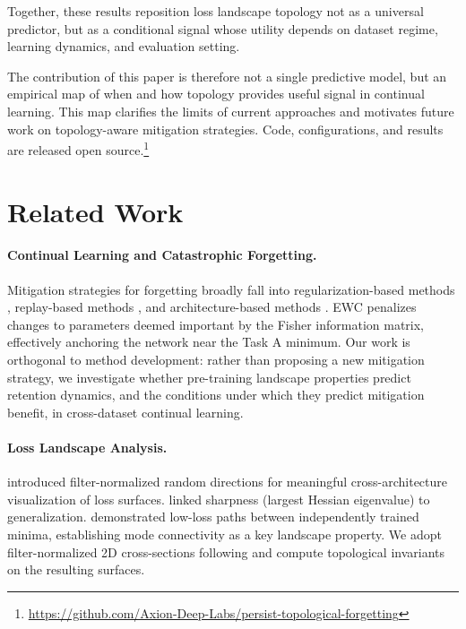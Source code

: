 \documentclass[10pt,twocolumn]{article}
\begin{document}
Together, these results reposition loss landscape topology not as a universal predictor, but as a conditional signal whose utility depends on dataset regime, learning dynamics, and evaluation setting.

The contribution of this paper is therefore not a single predictive model, but an empirical map of when and how topology provides useful signal in continual learning. This map clarifies the limits of current approaches and motivates future work on topology-aware mitigation strategies. Code, configurations, and results are released open source.\footnote{\url{https://github.com/Axion-Deep-Labs/persist-topological-forgetting}}

\section{Related Work}
\label{sec:related}

\paragraph{Continual Learning and Catastrophic Forgetting.}
Mitigation strategies for forgetting broadly fall into regularization-based methods \citep{kirkpatrick2017overcoming, zenke2017continual}, replay-based methods \citep{rebuffi2017icarl, shin2017continual}, and architecture-based methods \citep{rusu2016progressive, mallya2018packnet}. EWC \citep{kirkpatrick2017overcoming} penalizes changes to parameters deemed important by the Fisher information matrix, effectively anchoring the network near the Task A minimum. Our work is orthogonal to method development: rather than proposing a new mitigation strategy, we investigate whether pre-training landscape properties predict retention dynamics, and the conditions under which they predict mitigation benefit, in cross-dataset continual learning.

\paragraph{Loss Landscape Analysis.}
\citet{li2018visualizing} introduced filter-normalized random directions for meaningful cross-architecture visualization of loss surfaces. \citet{keskar2017on} linked sharpness (largest Hessian eigenvalue) to generalization. \citet{garipov2018loss} demonstrated low-loss paths between independently trained minima, establishing mode connectivity as a key landscape property. We adopt filter-normalized 2D cross-sections following \citet{li2018visualizing} and compute topological invariants on the resulting surfaces.
\end{document}
